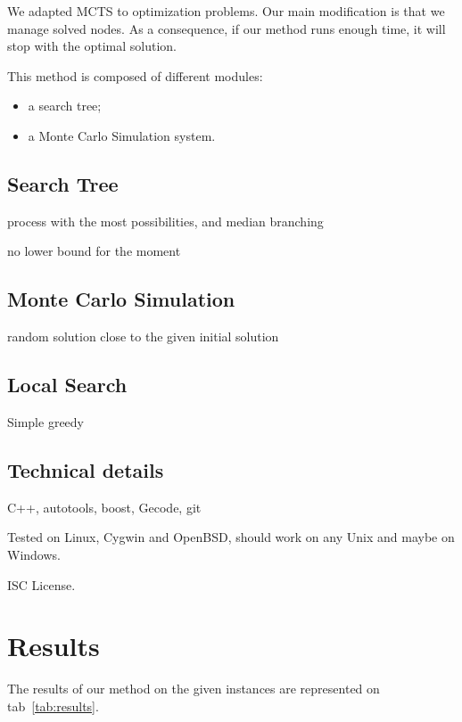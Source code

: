 \documentclass[a4paper,twocolumn]{article}
\begin{document}
We adapted MCTS to optimization problems. Our main modification is
that we manage solved nodes.  As a consequence, if our method runs
enough time, it will stop with the optimal solution.

This method is composed of different modules:
\begin{itemize}
\item a search tree;
\item a Monte Carlo Simulation system.
\end{itemize}

\subsection{Search Tree}

process with the most possibilities, and median branching

no lower bound for the moment

\subsection{Monte Carlo Simulation}

random solution close to the given initial solution

\subsection{Local Search}

Simple greedy

\subsection{Technical details}

C++, autotools, boost, Gecode, git

Tested on Linux, Cygwin and OpenBSD, should work on any Unix and maybe
on Windows.

ISC License.

\section{Results}

The results of our method on the given instances are represented on
tab~\ref{tab:results}.
\end{document}
